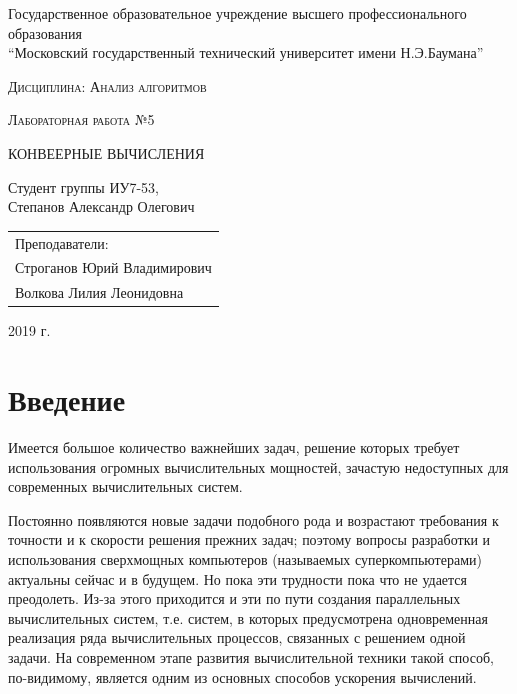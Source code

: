 \documentclass[a4paper,12pt]{article}
\newcommand{\anonsection}[1]{\section*{#1}\addcontentsline{toc}{section}{#1}}
\begin{document}
\begin{titlepage}

    \begin{center}
        \large
        Государственное образовательное учреждение высшего профессионального образования\\
        “Московский государственный технический университет имени Н.Э.Баумана”
        \vspace{3cm}

        \textsc{Дисциплина: Анализ алгоритмов}
        \vspace{0.5cm}

        \textsc{Лабораторная работа №5}
        \vspace{3cm}

        {\LARGE КОНВЕЕРНЫЕ ВЫЧИСЛЕНИЯ}
        \vspace{3cm}

        Студент группы ИУ7-53,\\
        Степанов Александр Олегович
        \vfill
    \end{center}

    \begin{flushright}
        \begin{tabular}{l}
            Преподаватели:\\
            Строганов Юрий Владимирович\\
            Волкова Лилия Леонидовна
        \end{tabular}
    \end{flushright}

    \begin{center}

        2019 г.

    \end{center}

\end{titlepage}

\tableofcontents

\newpage
\anonsection{Введение}

Имеется большое количество важнейших задач, решение которых требует использования огромных вычислительных мощностей, зачастую недоступных для современных вычислительных систем.

Постоянно появляются новые задачи подобного рода и возрастают требования к точности и к скорости решения прежних задач; поэтому вопросы разработки и использования сверхмощных компьютеров (называемых суперкомпьютерами) актуальны сейчас и в будущем. \cite{Voevodin} Но пока эти трудности пока что не удается преодолеть. Из-за этого приходится и эти по пути создания параллельных вычислительных систем, т.е. систем, в которых предусмотрена одновременная реализация ряда вычислительных процессов, связанных с решением одной задачи. \cite{Korneev} На современном этапе развития вычислительной техники такой способ, по-видимому, является одним из основных способов ускорения вычислений.
\end{document}
